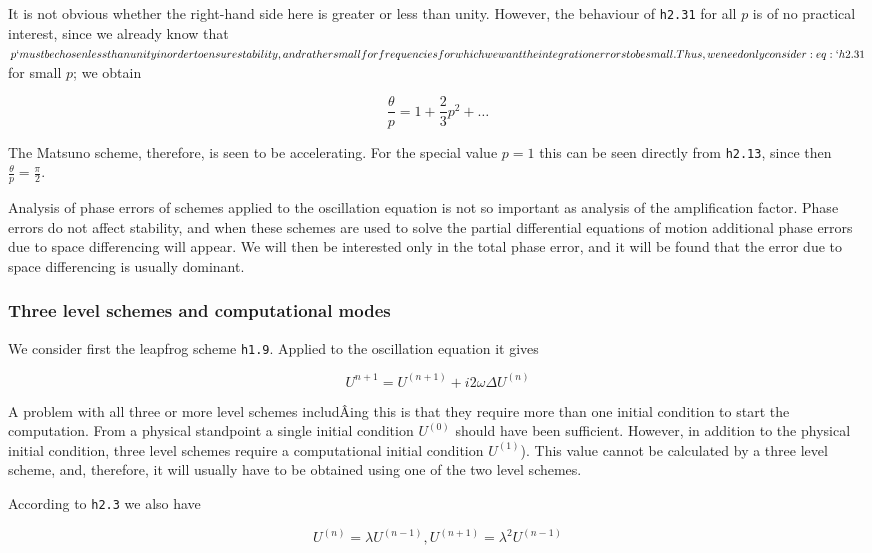 It is not obvious whether the right-hand side here is greater or less
than unity. However, the behaviour of \texttt{h2.31} for all \(p\) is of
no practical interest, since we already know that \(p`must be chosen
less than unity in order to ensure stability, and rather small for
frequencies for which we want the integration errors to be small. Thus,
we need only consider :eq:`h2.31\) for small \(p\); we obtain

\[\frac{\theta}{p} = 1 + \frac{2}{3}p^{2} + \ldots\]

The Matsuno scheme, therefore, is seen to be accelerating. For the
special value \(p = 1\) this can be seen directly from \texttt{h2.13},
since then \(\frac{\theta}{p} = \frac{\pi}{2}\).

Analysis of phase errors of schemes applied to the oscillation equation
is not so important as analysis of the amplification factor. Phase
errors do not affect stability, and when these schemes are used to solve
the partial differential equations of motion additional phase errors due
to space differencing will appear. We will then be interested only in
the total phase error, and it will be found that the error due to space
differencing is usually dominant.

\subsubsection{Three level schemes and computational
modes}\label{three-level-schemes-and-computational-modes}

We consider first the leapfrog scheme \texttt{h1.9}. Applied to the
oscillation equation it gives

\[U^{n + 1} = U^{( n + 1 )} + i 2\omega\Delta U^{\left( n \right)}\]

A problem with all three or more level schemes includÂ­ing this is that
they require more than one initial condition to start the computation.
From a physical standpoint a single initial condition
\(U^{\left( 0 \right)}\) should have been sufficient. However, in
addition to the physical initial condition, three level schemes require
a computational initial condition \(U^{\left( 1 \right)}\)). This value
cannot be calculated by a three level scheme, and, therefore, it will
usually have to be obtained using one of the two level schemes.

According to \texttt{h2.3} we also have

\[U^{\left( n \right)} = \lambda U^{\left( n - 1 \right)},
U^{\left( n + 1 \right)} = \lambda^{2}U^{\left( n - 1 \right)}\]

